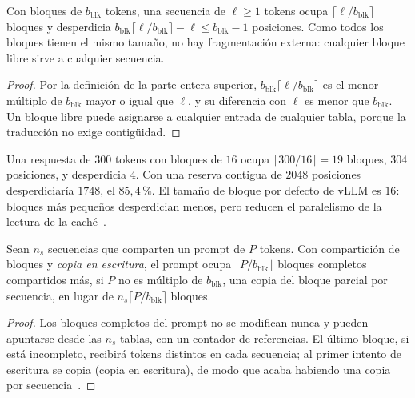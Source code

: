 \begin{proposicion}\label{prop:desperdicio}
Con bloques de $b_{\mathrm{blk}}$ tokens, una secuencia de $\ell\ge 1$ tokens ocupa $\lceil\ell/b_{\mathrm{blk}}\rceil$ bloques y desperdicia $b_{\mathrm{blk}}\lceil\ell/b_{\mathrm{blk}}\rceil-\ell\le b_{\mathrm{blk}}-1$ posiciones. Como todos los bloques tienen el mismo tamaño, no hay fragmentación externa: cualquier bloque libre sirve a cualquier secuencia.
\end{proposicion}

\begin{proof}
Por la definición de la parte entera superior, $b_{\mathrm{blk}}\lceil\ell/b_{\mathrm{blk}}\rceil$ es el menor múltiplo de $b_{\mathrm{blk}}$ mayor o igual que $\ell$, y su diferencia con $\ell$ es menor que $b_{\mathrm{blk}}$. Un bloque libre puede asignarse a cualquier entrada de cualquier tabla, porque la traducción no exige contigüidad.
\end{proof}

\begin{ejemplo}\label{ej:bloques}
Una respuesta de $300$ tokens con bloques de $16$ ocupa $\lceil 300/16\rceil=19$ bloques, $304$ posiciones, y desperdicia $4$. Con una reserva contigua de $2048$ posiciones desperdiciaría $1748$, el $85{,}4\,\%$. El tamaño de bloque por defecto de vLLM es $16$: bloques más pequeños desperdician menos, pero reducen el paralelismo de la lectura de la caché~\cite[§7.2]{kwon}.
\end{ejemplo}

\begin{proposicion}\label{prop:prefijo}
Sean $n_s$ secuencias que comparten un prompt de $P$ tokens. Con compartición de bloques y \emph{copia en escritura}, el prompt ocupa $\lfloor P/b_{\mathrm{blk}}\rfloor$ bloques completos compartidos más, si $P$ no es múltiplo de $b_{\mathrm{blk}}$, una copia del bloque parcial por secuencia, en lugar de $n_s\lceil P/b_{\mathrm{blk}}\rceil$ bloques.
\end{proposicion}

\begin{proof}
Los bloques completos del prompt no se modifican nunca y pueden apuntarse desde las $n_s$ tablas, con un contador de referencias. El último bloque, si está incompleto, recibirá tokens distintos en cada secuencia; al primer intento de escritura se copia (copia en escritura), de modo que acaba habiendo una copia por secuencia~\cite[§4.3 y §4.4]{kwon}.
\end{proof}

